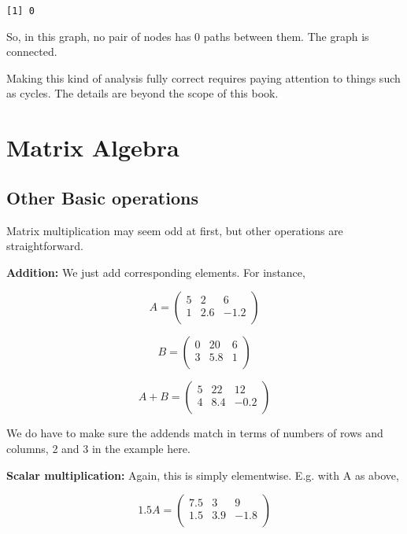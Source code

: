 \documentclass[
  letterpaper,
  DIV=11,
  numbers=noendperiod,
  oneside]{scrreprt}
\begin{document}
\begin{verbatim}
[1] 0
\end{verbatim}

So, in this graph, no pair of nodes has 0 paths between them. The graph
is connected.

Making this kind of analysis fully correct requires paying attention to
things such as cycles. The details are beyond the scope of this book.

\hypertarget{matrix-algebra}{%
\section{Matrix Algebra}\label{matrix-algebra}}

\hypertarget{other-basic-operations}{%
\subsection{Other Basic operations}\label{other-basic-operations}}

Matrix multiplication may seem odd at first, but other operations are
straightforward.

\textbf{Addition:} We just add corresponding elements. For instance,

\[
A = \left (
\begin{array}{rr}
5 & 2 & 6 \\
1 & 2.6 & -1.2 \\
\end{array}
\right )
\]

\[
B = \left (
\begin{array}{rr}
0 & 20 & 6 \\
3 & 5.8 & 1 \\
\end{array}
\right )
\]

\[
A+B = \left (
\begin{array}{rr}
5 & 22 & 12 \\
4 & 8.4 & -0.2 \\
\end{array}
\right )
\]

We do have to make sure the addends match in terms of numbers of rows
and columns, 2 and 3 in the example here.

\textbf{Scalar multiplication:} Again, this is simply elementwise. E.g.
with A as above,

\[
1.5 A = \left (
\begin{array}{rr}
7.5 & 3 & 9 \\
1.5 & 3.9 & -1.8 \\
\end{array}
\right )
\]
\end{document}
